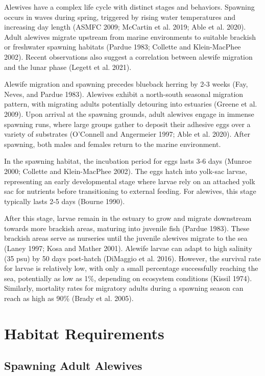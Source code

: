 \documentclass[
]{book}
\begin{document}
Alewives have a complex life cycle with distinct stages and behaviors. Spawning occurs in waves during spring, triggered by rising water temperatures and increasing day length (ASMFC 2009; McCartin et al. 2019; Able et al. 2020). Adult alewives migrate upstream from marine environments to suitable brackish or freshwater spawning habitats (Pardue 1983; Collette and Klein-MacPhee 2002). Recent observations also suggest a correlation between alewife migration and the lunar phase (Legett et al. 2021).

Alewife migration and spawning precedes blueback herring by 2-3 weeks (Fay, Neves, and Pardue 1983). Alewives exhibit a north-south seasonal migration pattern, with migrating adults potentially detouring into estuaries (Greene et al. 2009). Upon arrival at the spawning grounds, adult alewives engage in immense spawning runs, where large groups gather to deposit their adhesive eggs over a variety of substrates (O'Connell and Angermeier 1997; Able et al. 2020). After spawning, both males and females return to the marine environment.

In the spawning habitat, the incubation period for eggs lasts 3-6 days (Munroe 2000; Collette and Klein-MacPhee 2002). The eggs hatch into yolk-sac larvae, representing an early developmental stage where larvae rely on an attached yolk sac for nutrients before transitioning to external feeding. For alewives, this stage typically lasts 2-5 days (Bourne 1990).

After this stage, larvae remain in the estuary to grow and migrate downstream towards more brackish areas, maturing into juvenile fish (Pardue 1983). These brackish areas serve as nurseries until the juvenile alewives migrate to the sea (Laney 1997; Kosa and Mather 2001). Alewife larvae can adapt to high salinity (35 psu) by 50 days post-hatch (DiMaggio et al. 2016). However, the survival rate for larvae is relatively low, with only a small percentage successfully reaching the sea, potentially as low as 1\%, depending on ecosystem conditions (Kissil 1974). Similarly, mortality rates for migratory adults during a spawning season can reach as high as 90\% (Brady et al. 2005).

\hypertarget{habitat-requirements}{%
\section{Habitat Requirements}\label{habitat-requirements}}

\hypertarget{spawning-adult-alewives}{%
\subsection{Spawning Adult Alewives}\label{spawning-adult-alewives}}
\end{document}
